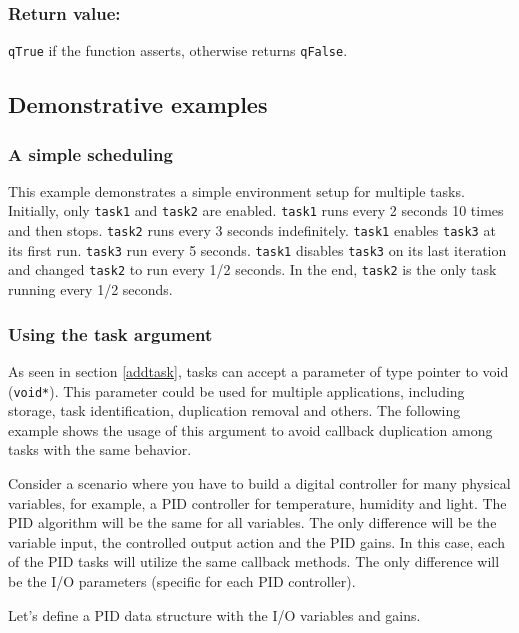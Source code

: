 \subsubsection*{Return value:}
\lstinline{qTrue} if the function asserts, otherwise returns \lstinline{qFalse}.

\subsection{Demonstrative examples}
\subsubsection{A simple scheduling}
This example demonstrates a simple environment setup for multiple tasks. Initially, only \lstinline{task1} and \lstinline{task2} are enabled. \lstinline{task1} runs every 2 seconds 10 times and then stops. \lstinline{task2} runs every 3 seconds indefinitely. \lstinline{task1} enables \lstinline{task3} at its first run. \lstinline{task3} run every 5 seconds. \lstinline{task1} disables \lstinline{task3} on its last iteration and changed \lstinline{task2} to run every 1/2 seconds. In the end, \lstinline{task2} is the only task running every 1/2 seconds.
\medskip



\subsubsection{Using the task argument}
As seen in section \ref{addtask}, tasks can accept a parameter of type pointer to void (\lstinline{void*}). 
This parameter could be used for multiple applications, including storage, task identification, duplication removal and others. The following example shows the usage of this argument to avoid callback duplication among tasks with the same behavior. 

Consider a scenario where you have to build a digital controller for many physical variables, for example, a PID controller for temperature, humidity and light. The PID algorithm will be the same for all variables. The only difference will be the variable input, the controlled output action and the PID gains. In this case, each of the PID tasks will utilize the same callback methods. The only difference will be the I/O parameters (specific for each PID controller). 
\medskip

Let's define a PID data structure with the I/O variables and gains.
\medskip
 
